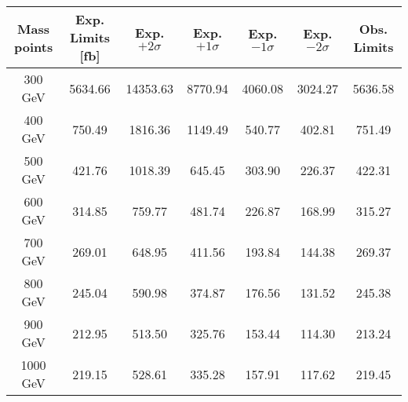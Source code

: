
\begin{table}
\begin{center}
\begin{tabular}{c|cccccc}
\hline
\hline
Mass points & Exp. Limits [fb] & Exp. $+2\sigma$ & Exp. $+1\sigma$ &  Exp. $-1\sigma$  &  Exp. $-2\sigma$ & Obs. Limits \\
\hline
300 GeV  &  5634.66  & 14353.63  & 8770.94  & 4060.08  & 3024.27   & 5636.58\\
400 GeV  &  750.49  & 1816.36  & 1149.49  & 540.77  & 402.81   & 751.49\\
500 GeV  &  421.76  & 1018.39  & 645.45  & 303.90  & 226.37   & 422.31\\
600 GeV  &  314.85  & 759.77  & 481.74  & 226.87  & 168.99   & 315.27\\
700 GeV  &  269.01  & 648.95  & 411.56  & 193.84  & 144.38   & 269.37\\
800 GeV  &  245.04  & 590.98  & 374.87  & 176.56  & 131.52   & 245.38\\
900 GeV  &  212.95  & 513.50  & 325.76  & 153.44  & 114.30   & 213.24\\
1000 GeV  &  219.15  & 528.61  & 335.28  & 157.91  & 117.62   & 219.45\\

\hline
\hline
\end{tabular}
\end{center}
\end{table}
